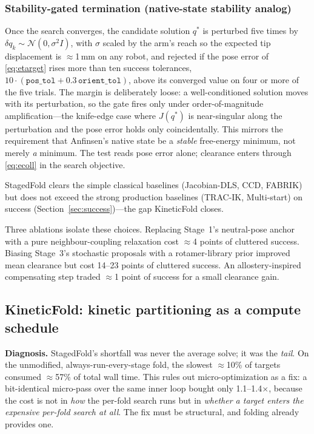 \documentclass[10pt,conference]{IEEEtran}
\begin{document}
\subsubsection{Stability-gated termination (native-state stability analog)}
\label{sec:stability}
Once the search converges, the candidate solution $q^{*}$ is perturbed five times
by $\delta q_k \sim \mathcal{N}(0, \sigma^2 I)$, with $\sigma$ scaled by the
arm's reach so the expected tip displacement is $\approx$1\,mm on any robot, and
rejected if the pose error of \eqref{eq:etarget} rises more than ten success
tolerances, $10 \cdot (\texttt{pos\_tol} + 0.3\,\texttt{orient\_tol})$, above its
converged value on four or more of the five trials. The margin is deliberately
loose: a well-conditioned solution moves with its perturbation, so the gate fires
only under order-of-magnitude amplification---the knife-edge case where
$J(q^{*})$ is near-singular along the perturbation and the pose error holds only
coincidentally. This mirrors the requirement that Anfinsen's native state be a
\emph{stable} free-energy minimum, not merely \emph{a} minimum. The test reads
pose error alone; clearance enters through \eqref{eq:ecoll} in the search
objective.

StagedFold clears the simple classical baselines (Jacobian-DLS, CCD, FABRIK) but
does not exceed the strong production baselines (TRAC-IK, Multi-start) on success
(Section~\ref{sec:success})---the gap KineticFold closes.

Three ablations isolate these choices. Replacing Stage~1's neutral-pose anchor
with a pure neighbour-coupling relaxation cost $\approx$4 points of cluttered
success. Biasing Stage~3's stochastic proposals with a rotamer-library prior
improved mean clearance but cost 14--23 points of cluttered success. An
allostery-inspired compensating step traded $\approx$1 point of success for a
small clearance gain.

\subsection{KineticFold: kinetic partitioning as a compute schedule}
\label{sec:kinetic}

\textbf{Diagnosis.} StagedFold's shortfall was never the average solve; it was
the \emph{tail}. On the unmodified, always-run-every-stage fold, the slowest
$\approx$10\% of targets consumed $\approx$57\% of total wall time. This rules
out micro-optimization as a fix: a bit-identical micro-pass over the same inner
loop bought only 1.1--1.4$\times$, because the cost is not in \emph{how} the
per-fold search runs but in \emph{whether a target enters the expensive per-fold
search at all}. The fix must be structural, and folding already provides one.
\end{document}
